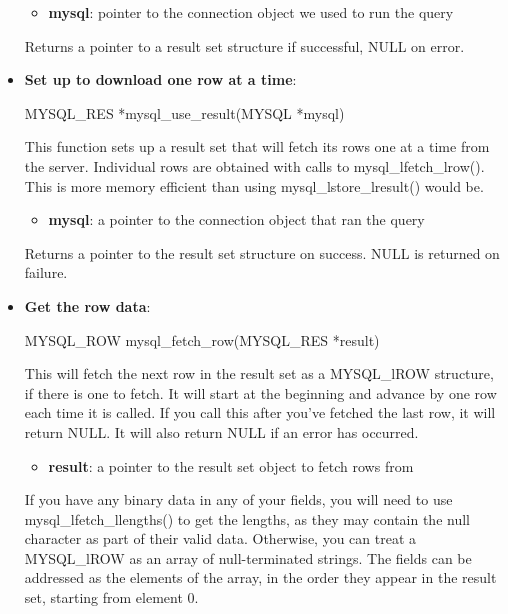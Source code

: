 \documentclass{report}
\begin{document}
\begin{itemize}
            \begin{itemize}
                \item \textbf{mysql}: pointer to the connection object we used to run the query
            \end{itemize}
            \bigbreak \noindent 
            Returns a pointer to a result set structure if successful, NULL on error.
        \item \textbf{Set up to download one row at a time}:
            \bigbreak \noindent 
            \begin{cppcode}
            MYSQL_RES *mysql_use_result(MYSQL *mysql)
            \end{cppcode}
            \bigbreak \noindent 
            This function sets up a result set that will fetch its rows one at a time from the server. Individual rows are obtained with calls to mysql\_lfetch\_lrow(). This is more memory efficient than using mysql\_lstore\_lresult() would be.
            \begin{itemize}
                \item \textbf{mysql}: a pointer to the connection object that ran the query
            \end{itemize}
            \bigbreak \noindent 
            Returns a pointer to the result set structure on success. NULL is returned on failure.
        \item \textbf{Get the row data}:
            \bigbreak \noindent 
            \begin{cppcode}
            MYSQL_ROW mysql_fetch_row(MYSQL_RES *result)
            \end{cppcode}
            \bigbreak \noindent 
            This will fetch the next row in the result set as a MYSQL\_lROW structure, if there is one to fetch. It will start at the beginning and advance by one row each time it is called. If you call this after you’ve fetched the last row, it will return NULL. It will also return NULL if an error has occurred.
            \bigbreak \noindent 
            \begin{itemize}
                \item \textbf{result}: a pointer to the result set object to fetch rows from
            \end{itemize}
            \bigbreak \noindent 
            If you have any binary data in any of your fields, you will need to use mysql\_lfetch\_llengths() to get the lengths, as they may contain the null character as part of their valid data. Otherwise, you can treat a MYSQL\_lROW as an array of null-terminated strings. The fields can be addressed as the elements of the array, in the order they appear in the result set, starting from element 0.

\end{itemize}
\end{document}
